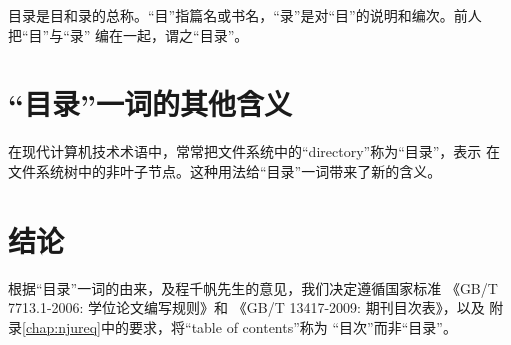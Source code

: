 目录是目和录的总称。“目”指篇名或书名，“录”是对“目”的说明和编次。前人把“目”与“录”
编在一起，谓之“目录”。

\section{“目录”一词的其他含义}

在现代计算机技术术语中，常常把文件系统中的“directory”称为“目录”，表示
在文件系统树中的非叶子节点。这种用法给“目录”一词带来了新的含义。

\section{结论}

根据“目录”一词的由来，及程千帆先生的意见，我们决定遵循国家标准
《GB/T 7713.1-2006: 学位论文编写规则》\cite{gbt7713.1-2006}和
《GB/T 13417-2009: 期刊目次表》\cite{gbt13417-2009}，以及
附录\ref{chap:njureq}中的要求，将``table of contents''称为
“目次”而非“目录”。

